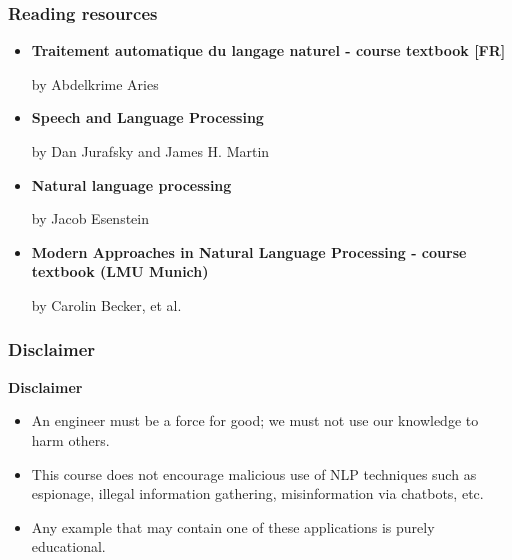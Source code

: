 \documentclass{beamer}
\begin{document}
\begin{frame}
	\frametitle{Reading resources}
	
	\begin{itemize}
		
		\item \textbf{Traitement automatique du langage naturel - course textbook [FR]}
		
		by Abdelkrime Aries
		
		
		
		\item \textbf{Speech and Language Processing} 
		
		by Dan Jurafsky and James H. Martin
		
		
		\item \textbf{Natural language processing}
		
		by Jacob Esenstein 
		
		
		\item \textbf{Modern Approaches in Natural Language Processing - course textbook (LMU Munich)}
		
		by Carolin Becker, et al.
		
		
		
	\end{itemize}
	
\end{frame}

\begin{frame}
	\frametitle{Disclaimer}
	
	\begin{tcolorbox}[colback=red,
		colframe=red,  
		arc=0pt,outer arc=0pt,
		valign=top, 
		halign=center,
		width=\textwidth]
		
		\color{white}
		{\bfseries Disclaimer}
		
	\end{tcolorbox}\vspace{-.5cm}
	\begin{tcolorbox}[colback=my-grey,
		colframe=my-grey,  
		center, arc=0pt,outer arc=0pt,
		valign=top, 
		halign=left,
		width=\textwidth]
		
		\begin{itemize}
			\item An engineer must be a force for good; we must not use our knowledge to harm others.
			\item This course does not encourage malicious use of NLP techniques such as espionage, illegal information gathering, misinformation via chatbots, etc.
			\item Any example that may contain one of these applications is purely educational.	
		\end{itemize}
		
	\end{tcolorbox}
	
\end{frame}
\end{document}
